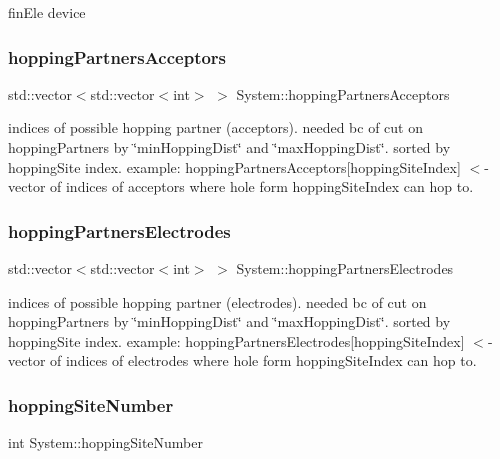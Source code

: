 fin\+Ele device \mbox{\label{classSystem_ae9ca6aa54468effc1fae57c2adc6c578}} 
\subsubsection{\texorpdfstring{hopping\+Partners\+Acceptors}{hoppingPartnersAcceptors}}
{\footnotesize\ttfamily std\+::vector$<$std\+::vector$<$int$>$ $>$ System\+::hopping\+Partners\+Acceptors\hspace{0.3cm}{\ttfamily [private]}}

indices of possible hopping partner (acceptors). needed bc of cut on hopping\+Partners by \char`\"{}min\+Hopping\+Dist\char`\"{} and \char`\"{}max\+Hopping\+Dist\char`\"{}. sorted by hopping\+Site index. example\+: hopping\+Partners\+Acceptors\mbox{[}hopping\+Site\+Index\mbox{]} $<$-\/ vector of indices of acceptors where hole form hopping\+Site\+Index can hop to. \mbox{\label{classSystem_a777232d4fec6f13fc7423a477f629a0f}} 
\subsubsection{\texorpdfstring{hopping\+Partners\+Electrodes}{hoppingPartnersElectrodes}}
{\footnotesize\ttfamily std\+::vector$<$std\+::vector$<$int$>$ $>$ System\+::hopping\+Partners\+Electrodes\hspace{0.3cm}{\ttfamily [private]}}

indices of possible hopping partner (electrodes). needed bc of cut on hopping\+Partners by \char`\"{}min\+Hopping\+Dist\char`\"{} and \char`\"{}max\+Hopping\+Dist\char`\"{}. sorted by hopping\+Site index. example\+: hopping\+Partners\+Electrodes\mbox{[}hopping\+Site\+Index\mbox{]} $<$-\/ vector of indices of electrodes where hole form hopping\+Site\+Index can hop to. \mbox{\label{classSystem_abace9493421abf20f1ae9502963a9b5d}} 
\subsubsection{\texorpdfstring{hopping\+Site\+Number}{hoppingSiteNumber}}
{\footnotesize\ttfamily int System\+::hopping\+Site\+Number\hspace{0.3cm}{\ttfamily [private]}}

